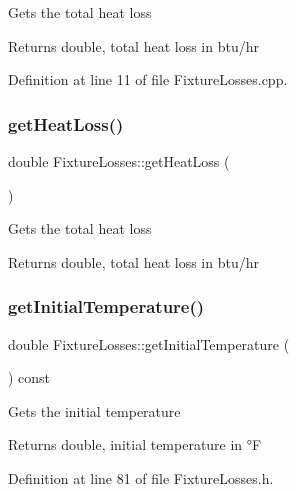 Gets the total heat loss \begin{DoxyReturn}{Returns}
double, total heat loss in btu/hr 
\end{DoxyReturn}


Definition at line 11 of file Fixture\+Losses.\+cpp.

\mbox{\label{class_fixture_losses_a6829840bdf0607d52adaa9b5ee6ded75}} 
\subsubsection{\texorpdfstring{get\+Heat\+Loss()}{getHeatLoss()}\hspace{0.1cm}{\footnotesize\ttfamily [3/3]}}
{\footnotesize\ttfamily double Fixture\+Losses\+::get\+Heat\+Loss (\begin{DoxyParamCaption}{ }\end{DoxyParamCaption})}

Gets the total heat loss \begin{DoxyReturn}{Returns}
double, total heat loss in btu/hr 
\end{DoxyReturn}
\mbox{\label{class_fixture_losses_aaa2e1042b71482b377e93d675909f78e}} 
\subsubsection{\texorpdfstring{get\+Initial\+Temperature()}{getInitialTemperature()}\hspace{0.1cm}{\footnotesize\ttfamily [1/3]}}
{\footnotesize\ttfamily double Fixture\+Losses\+::get\+Initial\+Temperature (\begin{DoxyParamCaption}{ }\end{DoxyParamCaption}) const\hspace{0.3cm}{\ttfamily [inline]}}

Gets the initial temperature \begin{DoxyReturn}{Returns}
double, initial temperature in °F 
\end{DoxyReturn}


Definition at line 81 of file Fixture\+Losses.\+h.

